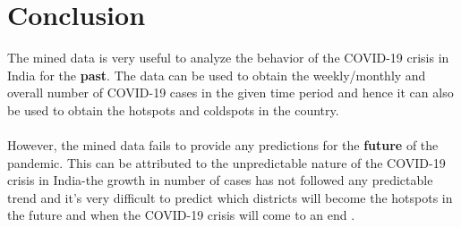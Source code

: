 \documentclass{article}
\begin{document}
\section{Conclusion}
The mined data is very useful to analyze the behavior of the COVID-19 crisis in India for the \textbf{past}. The data can be used to obtain the weekly/monthly and overall number of COVID-19 cases in the given time period and hence it can also be used to obtain the hotspots and coldspots in the country. \\
\\
However, the mined data fails to provide any predictions for the \textbf{future} of the pandemic. This can be attributed to the unpredictable nature of the COVID-19 crisis in India-the growth in number of cases has not followed any predictable trend and it's very difficult to predict which districts will become the hotspots in the future and when the COVID-19 crisis will come to an end .
\end{document}
